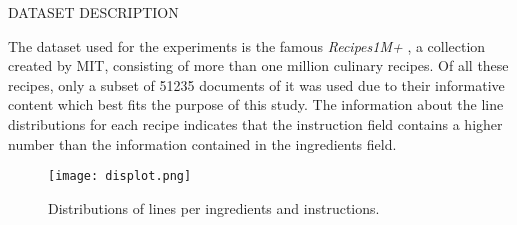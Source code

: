 \begin{frame}{DATASET DESCRIPTION}
    \begin{minipage}{\linewidth}
        \centering
        \begin{minipage}{0.45\linewidth}
            The dataset used for the experiments is the famous \emph{Recipes1M+} \footnotemark[1], a collection 
            created by MIT, consisting of more than one million culinary recipes. Of 
            all these recipes, only a subset of 51235 documents of it was used due to their 
            informative content which best fits the purpose of this study. The information 
            about the line distributions for each recipe indicates that the instruction 
            field contains a higher number than the information contained in the ingredients 
            field.
        \end{minipage}
        \hspace{0.05\linewidth}
        \begin{minipage}{0.47\linewidth}
            \begin{figure}[h!]
                \centering
                \texttt{[image: displot.png]}
                \centering
                \caption{Distributions of lines per ingredients and instructions.}
                \label{distributions}
            \end{figure}
        \end{minipage}
    \end{minipage}
\end{frame}


